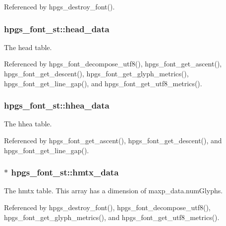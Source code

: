 Referenced by hpgs\_\-destroy\_\-font().

\subsubsection[{head\_\-data}]{ {\bf hpgs\_\-font\_\-st::head\_\-data}}\label{structhpgs__font__st_ae44f21e47f3899aa4b93e29ac37b9c18}
The head table. 

Referenced by hpgs\_\-font\_\-decompose\_\-utf8(), hpgs\_\-font\_\-get\_\-ascent(), hpgs\_\-font\_\-get\_\-descent(), hpgs\_\-font\_\-get\_\-glyph\_\-metrics(), hpgs\_\-font\_\-get\_\-line\_\-gap(), and hpgs\_\-font\_\-get\_\-utf8\_\-metrics().

\subsubsection[{hhea\_\-data}]{ {\bf hpgs\_\-font\_\-st::hhea\_\-data}}\label{structhpgs__font__st_ad99549398296db0897256d54cbbc13f3}
The hhea table. 

Referenced by hpgs\_\-font\_\-get\_\-ascent(), hpgs\_\-font\_\-get\_\-descent(), and hpgs\_\-font\_\-get\_\-line\_\-gap().

\subsubsection[{hmtx\_\-data}]{$\ast$ {\bf hpgs\_\-font\_\-st::hmtx\_\-data}}\label{structhpgs__font__st_a8ac77bb0e5f432ed7e32e994aac4dc6d}
The hmtx table. This array has a dimension of maxp\_\-data.numGlyphs. 

Referenced by hpgs\_\-destroy\_\-font(), hpgs\_\-font\_\-decompose\_\-utf8(), hpgs\_\-font\_\-get\_\-glyph\_\-metrics(), and hpgs\_\-font\_\-get\_\-utf8\_\-metrics().

